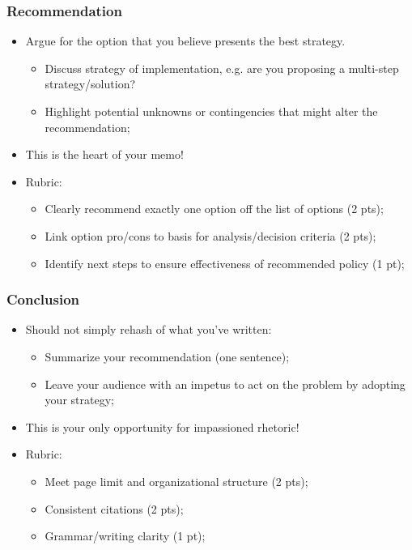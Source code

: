 \documentclass[aspectratio=169]{beamer}
\theoremstyle{principle}
\begin{document}
\begin{frame}
\frametitle{Recommendation}

\begin{itemize}

\item Argue for the option that you believe presents the best strategy. 
 
\begin{itemize} 
\item Discuss strategy of implementation, e.g. are you proposing a multi-step strategy/solution? 
\item Highlight potential unknowns or contingencies that might alter the recommendation;
\end{itemize}
\bigskip
\bigskip
\item This is the heart of your memo!
\bigskip
\bigskip
\item Rubric:
\begin{itemize}
\item Clearly recommend exactly one option off the list of options (2 pts);
\item Link option pro/cons to basis for analysis/decision criteria (2 pts);
\item Identify next steps to ensure effectiveness of recommended policy (1 pt);
\end{itemize}
\end{itemize}

\end{frame}

\begin{frame}
\frametitle{Conclusion}

\begin{itemize}

\item Should not simply rehash of what you’ve written:
\begin{itemize} 
\item Summarize your recommendation (one sentence);
\item Leave your audience with an impetus to act on the problem by adopting your strategy;
\end{itemize}
\bigskip
\bigskip
\item This is your only opportunity for impassioned rhetoric!
\bigskip
\bigskip
\item Rubric:
\begin{itemize}
\item Meet page limit and organizational structure (2 pts);
\item Consistent citations (2 pts);
\item Grammar/writing clarity (1 pt);
\end{itemize}
\end{itemize}

\end{frame}
\end{document}
